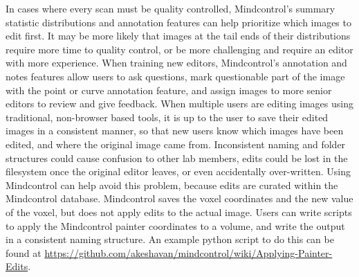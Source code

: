 In cases where every scan must be quality controlled, Mindcontrol's summary statistic distributions and annotation features can help prioritize which images to edit first. It may be more likely that images at the tail ends of their distributions require more time to quality control, or be more challenging and require an editor with more experience. When training new editors, Mindcontrol's annotation and notes features allow users to ask questions, mark questionable part of the image with the point or curve annotation feature, and assign images to more senior editors to review and give feedback. When multiple users are editing images using traditional, non-browser based tools, it is up to the user to save their edited images in a consistent manner, so that new users know which images have been edited, and where the original image came from. Inconsistent naming and folder structures could cause confusion to other lab members, edits could be lost in the filesystem once the original editor leaves, or even accidentally over-written. Using Mindcontrol can help avoid this problem, because edits are curated within the Mindcontrol database. Mindcontrol saves the voxel coordinates and the new value of the voxel, but does not apply edits to the actual image. Users can write scripts to apply the Mindcontrol painter coordinates to a volume, and write the output in a consistent naming structure. An example python script to do this can be found at \href{http://}{https://github.com/akeshavan/mindcontrol/wiki/Applying-Painter-Edits}.



